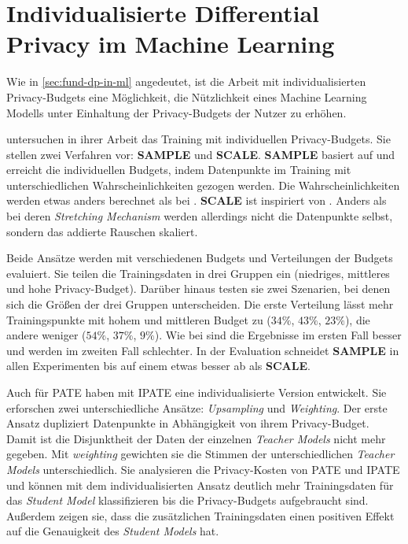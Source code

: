 \section{Individualisierte Differential Privacy im Machine Learning}\label{sec:rw-idp-ml}

Wie in \autoref{sec:fund-dp-in-ml} angedeutet, ist die Arbeit mit individualisierten Privacy-Budgets eine Möglichkeit, die Nützlichkeit eines Machine Learning Modells unter Einhaltung der Privacy-Budgets der Nutzer zu erhöhen.

\textcite{boenisch:2023} untersuchen in ihrer Arbeit das Training mit individuellen Privacy-Budgets. Sie stellen zwei Verfahren vor: \textbf{SAMPLE} und \textbf{SCALE}. \textbf{SAMPLE} basiert auf \textcite{jorgensen:2015} und erreicht die individuellen Budgets, indem Datenpunkte im Training mit unterschiedlichen Wahrscheinlichkeiten gezogen werden. Die Wahrscheinlichkeiten werden etwas anders berechnet als bei \textcite{jorgensen:2015}. \textbf{SCALE} ist inspiriert von \textcite{alaggan:2016}. Anders als bei deren \textit{Stretching Mechanism} werden allerdings nicht die Datenpunkte selbst, sondern das addierte Rauschen skaliert. 

Beide Ansätze werden mit verschiedenen Budgets und Verteilungen der Budgets evaluiert. Sie teilen die Trainingsdaten in drei Gruppen ein (niedriges, mittleres und hohe Privacy-Budget). Darüber hinaus testen sie zwei Szenarien, bei denen sich die Größen der drei Gruppen unterscheiden. Die erste Verteilung lässt mehr Trainingspunkte mit hohem und mittleren Budget zu ($34\%$, $43\%$, $23\%$), die andere weniger ($54\%$, $37\%$, $9\%$). Wie bei \textcite{jorgensen:2015} sind die Ergebnisse im ersten Fall besser und werden im zweiten Fall schlechter. In der Evaluation schneidet \textbf{SAMPLE} in allen Experimenten bis auf einem etwas besser ab als \textbf{SCALE}.

Auch für PATE haben \textcite{boenisch:2023b} mit IPATE eine individualisierte Version entwickelt. Sie erforschen zwei unterschiedliche Ansätze: \textit{Upsampling} und \textit{Weighting}. Der erste Ansatz dupliziert Datenpunkte in Abhängigkeit von ihrem Privacy-Budget. Damit ist die Disjunktheit der Daten der einzelnen \textit{Teacher Models} nicht mehr gegeben. Mit \textit{weighting} gewichten sie die Stimmen der unterschiedlichen \textit{Teacher Models} unterschiedlich. Sie analysieren die Privacy-Kosten von PATE und IPATE und können mit dem individualisierten Ansatz deutlich mehr Trainingsdaten für das \textit{Student Model} klassifizieren bis die Privacy-Budgets aufgebraucht sind. Außerdem zeigen sie, dass die zusätzlichen Trainingsdaten einen positiven Effekt auf die Genauigkeit des \textit{Student Models} hat.

